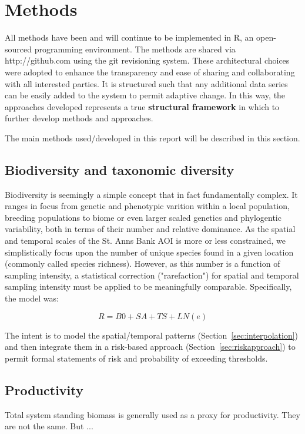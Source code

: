 \documentclass[letterpaper,portrait,11pt]{scrartcl}
\numberwithin{equation}{section}		%
\numberwithin{figure}{section}			%
\numberwithin{table}{section}				%
\begin{document}
\clearpage
\section{Methods}

All methods have been and will continue to be implemented in R, an open-sourced programming environment. The methods are shared via http://github.com using the git revisioning system. These architectural choices were adopted to enhance the transparency and ease of sharing and collaborating with all interested parties. It is structured such that any additional data series can be easily added to the system to permit adaptive change. In this way, the approaches developed represents a true \textbf{structural framework} in which to further develop methods and approaches. 

The main methods used/developed in this report will be described in this section.


\subsection{Biodiversity and taxonomic diversity}


Biodiversity is seemingly a simple concept that in fact fundamentally complex. It ranges in focus from genetic and phenotypic varition within a local population, breeding populations to biome or even larger scaled genetics and phylogentic variability, both in terms of their number and relative dominance. As the spatial and temporal scales of the St. Anns Bank AOI is more or less constrained, we simplistically focus upon the number of unique species found in a given location (commonly called species richness). However, as this number is a function of sampling intensity, a statistical correction ("rarefaction") for spatial and temporal sampling intensity must be applied to be meaningfully comparable. Specifically, the model was:

\[
R = B0 + SA + TS + LN(e)
\]

The intent is to model the spatial/temporal patterns (Section~\ref{sec:interpolation}) and then integrate them in a risk-based approach (Section~\ref{sec:riskapproach}) to permit formal statements of risk and probability of exceeding thresholds. 

\clearpage
\subsection{Productivity}

Total system standing biomass is generally used as a proxy for productivity. They are not the same. But ...
\end{document}
